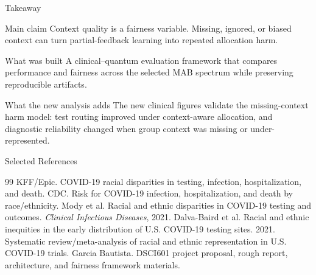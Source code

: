 \documentclass[aspectratio=169,10pt]{beamer}
\begin{document}
\begin{frame}{Takeaway}
\begin{block}{Main claim}
Context quality is a fairness variable. Missing, ignored, or biased context can turn partial-feedback learning into repeated allocation harm.
\end{block}
\begin{block}{What was built}
A clinical--quantum evaluation framework that compares performance and fairness across the selected MAB spectrum while preserving reproducible artifacts.
\end{block}
\begin{block}{What the new analysis adds}
The new clinical figures validate the missing-context harm model: test routing improved under context-aware allocation, and diagnostic reliability changed when group context was missing or under-represented.
\end{block}
\end{frame}

\begin{frame}[allowframebreaks]{Selected References}
\scriptsize
\begin{thebibliography}{99}
 KFF/Epic. COVID-19 racial disparities in testing, infection, hospitalization, and death.
 CDC. Risk for COVID-19 infection, hospitalization, and death by race/ethnicity.
 Mody et al. Racial and ethnic disparities in COVID-19 testing and outcomes. \textit{Clinical Infectious Diseases}, 2021.
 Dalva-Baird et al. Racial and ethnic inequities in the early distribution of U.S. COVID-19 testing sites. 2021.
 Systematic review/meta-analysis of racial and ethnic representation in U.S. COVID-19 trials.
 Garcia Bautista. DSCI601 project proposal, rough report, architecture, and fairness framework materials.
\end{thebibliography}
\end{frame}
\end{document}
